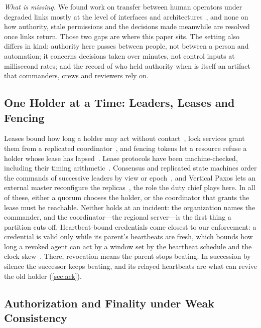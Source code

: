 \textit{What is missing.} We found work on transfer between human operators under degraded
links mostly at the level of interfaces and architectures~\cite{adekoya2026multioperator,rebolo2025c3},
and none on how authority, stale permissions and the decisions made meanwhile are resolved
once links return.  Those two gaps are
where this paper sits. The setting also differs in kind: authority here passes between
people, not between a person and automation; it concerns decisions taken over minutes, not
control inputs at millisecond rates; and the record of who held authority when is itself
an artifact that commanders, crews and reviewers rely on.

\subsection{One Holder at a Time: Leaders, Leases and Fencing}
\label{sec:related-leases}

Leases bound how long a holder may act without contact~\cite{gray1989leases}, lock services
grant them from a replicated coordinator~\cite{burrows2006chubby,hunt2010zookeeper}, and
fencing tokens let a resource refuse a holder whose lease has lapsed~\cite{kleppmann2017ddia}.
Lease protocols have been machine-checked, including their timing
arithmetic~\cite{trencseni2026paxoslease,sharma2023grove}. Consensus and replicated state
machines order the commands of successive leaders by view or
epoch~\cite{oki1988viewstamped,junqueira2011zab,ongaro2014raft}, and Vertical Paxos lets an
external master reconfigure the replicas~\cite{lamport2009vertical}, the role the duty
chief plays here. In all of these, either a quorum chooses the holder, or the coordinator
that grants the lease must be reachable. Neither holds at an incident: the organization
names the commander, and the coordinator---the regional server---is the first thing a
partition cuts off. Heartbeat-bound credentials come closest to our enforcement: a
credential is valid only while its parent's heartbeats are fresh, which bounds how long a
revoked agent can act by a window set by the heartbeat schedule and the clock
skew~\cite{deochake2026heartbeat}. There, revocation means the parent stops beating. In
succession by silence the successor keeps beating, and its relayed heartbeats are what can
revive the old holder (\cref{sec:ack}).

\subsection{Authorization and Finality under Weak Consistency}
\label{sec:related-finality}


